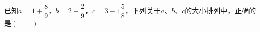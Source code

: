 已知$a=1+\dfrac{8}{9}$，$b=2-\dfrac{2}{9}$，$c=3-1\dfrac{5}{8}$，下列关于$a$、$b$、$c$的大小排列中，正确的是\hfill$\left(\qquad\right)$
